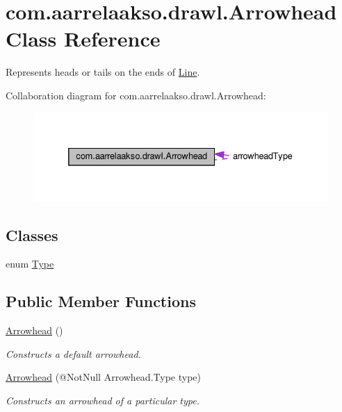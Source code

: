 \hypertarget{classcom_1_1aarrelaakso_1_1drawl_1_1_arrowhead}{}\section{com.\+aarrelaakso.\+drawl.\+Arrowhead Class Reference}
\label{classcom_1_1aarrelaakso_1_1drawl_1_1_arrowhead}


Represents heads or tails on the ends of \hyperlink{classcom_1_1aarrelaakso_1_1drawl_1_1_line}{Line}.  




Collaboration diagram for com.\+aarrelaakso.\+drawl.\+Arrowhead\+:
\nopagebreak
\begin{figure}[H]
\begin{center}
\leavevmode
\includegraphics[width=332pt]{d2/db3/classcom_1_1aarrelaakso_1_1drawl_1_1_arrowhead__coll__graph}
\end{center}
\end{figure}
\subsection*{Classes}
\begin{DoxyCompactItemize}
\item 
enum \hyperlink{enumcom_1_1aarrelaakso_1_1drawl_1_1_arrowhead_1_1_type}{Type}
\end{DoxyCompactItemize}
\subsection*{Public Member Functions}
\begin{DoxyCompactItemize}
\item 
\hyperlink{classcom_1_1aarrelaakso_1_1drawl_1_1_arrowhead_a866fb3900ad67226bad5962031cc7817}{Arrowhead} ()
\begin{DoxyCompactList}\small\item\em Constructs a default arrowhead. \end{DoxyCompactList}\item 
\hyperlink{classcom_1_1aarrelaakso_1_1drawl_1_1_arrowhead_a43464dd3355fda0d6e295d4282433828}{Arrowhead} (@Not\+Null Arrowhead.\+Type type)
\begin{DoxyCompactList}\small\item\em Constructs an arrowhead of a particular type. \end{DoxyCompactList}\end{DoxyCompactItemize}
